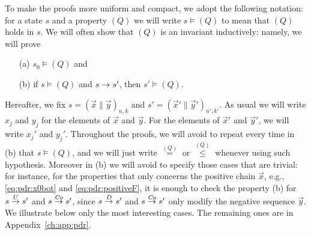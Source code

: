 To make the proofs more uniform and compact, we adopt the following notation: for a state $s$ and a property $(Q)$ we will write $s \models (Q)$ to mean that $(Q)$ holds in $s$. We will often show that $(Q)$ is an invariant inductively: namely, we will prove
\begin{itemize}
	\item[(a)] $s_0 \models (Q)$ and
	\item[(b)] if $s \models (Q)$ and $s \stackrel{ }{\to} s'$, then $s'\models (Q)$.
\end{itemize}
Hereafter, we fix $s=( \vec{x} \| \vec{y} )_{n,k}$ and $s'=( \vec{x}' \| \vec{y}' )_{n',k'}$. As usual we will write $x_j$ and $y_j$ for the elements of $\vec{x}$ and $\vec{y}$. For the elements of $\vec{x}'$ and $\vec{y}'$, we will write $x_j'$ and $y_j'$. Throughout the proofs, we will avoid to repeat every time in (b) that $s \models (Q)$, and we will just write $\stackrel{{(Q)}}{=}$ or $\stackrel{{(Q)}}{{\le}}$ whenever using such hypothesis. Moreover in (b) we will avoid to specify those cases that are trivial: for instance, for the properties that only concerns the positive chain $\vec{x}$, e.g., \eqref{eq:pdr:x0bot} and \eqref{eq:pdr:positiveF}, it is enough to check the property (b) for $s \stackrel{U}{\to} s'$ and $s \stackrel{\mathit{Co}}{\to} s'$, since $s \stackrel{D}{\to} s'$ and $s \stackrel{\mathit{Ca}}{\to} s'$ only modify the negative sequence $\vec{y}$.
We illustrate below only the most interesting cases. The remaining ones are in Appendix~\ref{ch:app:pdr}.

